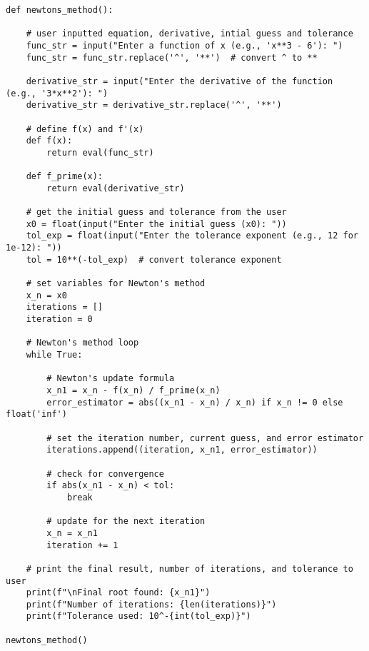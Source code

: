 \documentclass[9pt]{extarticle}
\begin{document}
\begin{lstlisting}
def newtons_method():
    
    # user inputted equation, derivative, intial guess and tolerance 
    func_str = input("Enter a function of x (e.g., 'x**3 - 6'): ")
    func_str = func_str.replace('^', '**')  # convert ^ to ** 

    derivative_str = input("Enter the derivative of the function (e.g., '3*x**2'): ")
    derivative_str = derivative_str.replace('^', '**')

    # define f(x) and f'(x) 
    def f(x):
        return eval(func_str) 

    def f_prime(x):
        return eval(derivative_str)

    # get the initial guess and tolerance from the user
    x0 = float(input("Enter the initial guess (x0): "))
    tol_exp = float(input("Enter the tolerance exponent (e.g., 12 for 1e-12): "))
    tol = 10**(-tol_exp)  # convert tolerance exponent

    # set variables for Newton's method
    x_n = x0
    iterations = []
    iteration = 0

    # Newton's method loop
    while True:
        
        # Newton's update formula
        x_n1 = x_n - f(x_n) / f_prime(x_n)
        error_estimator = abs((x_n1 - x_n) / x_n) if x_n != 0 else float('inf')

        # set the iteration number, current guess, and error estimator
        iterations.append((iteration, x_n1, error_estimator))

        # check for convergence
        if abs(x_n1 - x_n) < tol:
            break

        # update for the next iteration
        x_n = x_n1
        iteration += 1

    # print the final result, number of iterations, and tolerance to user
    print(f"\nFinal root found: {x_n1}")
    print(f"Number of iterations: {len(iterations)}")
    print(f"Tolerance used: 10^-{int(tol_exp)}")

newtons_method()


\end{lstlisting}
\end{document}
